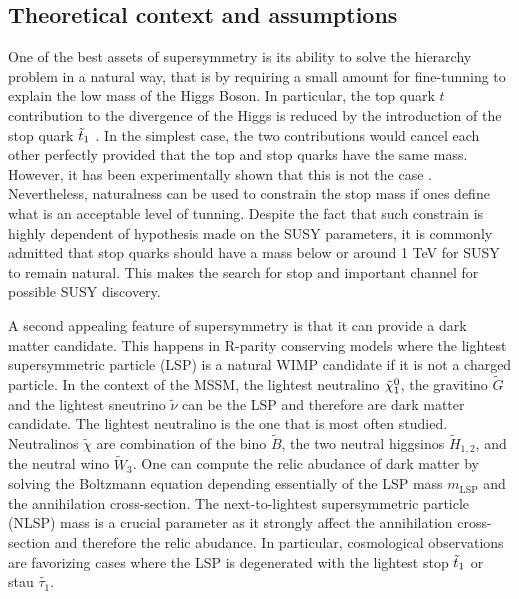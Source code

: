         \subsection{Theoretical context and assumptions}

        One of the best assets of supersymmetry is its ability to solve the hierarchy 
        problem in a natural way, that is by requiring a small amount for fine-tunning 
        to explain the low mass of the Higgs Boson. In particular, the top quark $t$ 
        contribution to the divergence of the Higgs is reduced by the introduction of 
        the stop quark $\tilde{t}_1$ . In the simplest case, the two 
        contributions would cancel each other perfectly provided that the top and stop 
        quarks have the same mass. However, it has been experimentally shown that this 
        is not the case . Nevertheless, naturalness can 
        be used to constrain the stop mass if ones define what is an acceptable level of 
        tunning. Despite the fact that such constrain is highly dependent of hypothesis
        made on the SUSY parameters, it is commonly admitted that stop quarks should have
        a mass below or around 1 TeV for SUSY to remain natural. This makes the search
        for stop and important channel for possible SUSY discovery.

        A second appealing feature of supersymmetry is that it can provide a dark matter 
        candidate. This happens in R-parity conserving models where the lightest supersymmetric
        particle (LSP) is a natural WIMP candidate if it is not a charged particle. In the
        context of the MSSM, the lightest neutralino $\tilde{\chi}_1^0$, the gravitino $\tilde{G}$
        and the lightest sneutrino $\tilde{\nu}$ can be the LSP and therefore are dark matter
        candidate. The lightest neutralino is the one that is most often studied. Neutralinos
        $\tilde{\chi}$ are combination of the bino $\tilde{B}$, the two neutral higgsinos 
        $\tilde{H}_{1,2}$, and the neutral wino $\tilde{W}_3$. One can compute the relic
        abudance of dark matter by solving the Boltzmann equation \cite{EllisDarkMatter}
        depending essentially of the LSP mass $m_{\text{LSP}}$ and the annihilation cross-section.
        The next-to-lightest supersymmetric particle (NLSP) mass is a crucial parameter as 
        it strongly affect the annihilation cross-section and therefore the relic abudance. 
        In particular, cosmological observations are favorizing cases where the LSP is 
        degenerated with the lightest stop $\tilde{t}_1$ or stau $\tilde{\tau_1}$.
        
